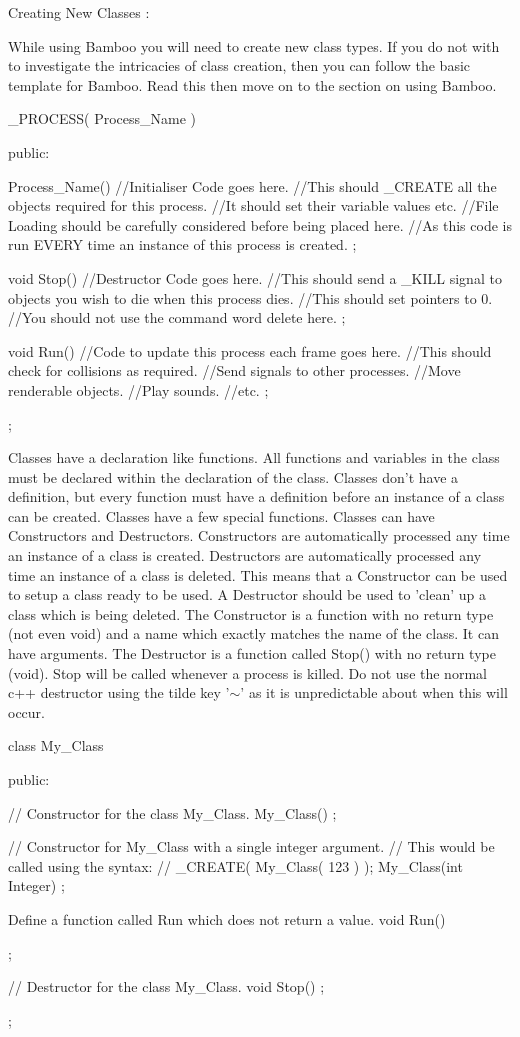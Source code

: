 Creating New Classes : \par
 While using Bamboo you will need to create new class types. If you do not with to investigate the intricacies of class creation, then you can follow the basic template for Bamboo. Read this then move on to the section on using Bamboo. 
\begin{DoxyCode}
 _PROCESS( Process_Name )
 {
 public:

 Process_Name()
 {
  //Initialiser Code goes here.
  //This should _CREATE all the objects required for this process.
  //It should set their variable values etc.
  //File Loading should be carefully considered before being placed here.
  //As this code is run EVERY time an instance of this process is created.
 };

 void Stop()
 {
  //Destructor Code goes here.
  //This should send a _KILL signal to objects you wish to die when this process 
      dies.
  //This should set pointers to 0.
  //You should not use the command word delete here.
 };

 void Run()
 {
  //Code to update this process each frame goes here.
  //This should check for collisions as required.
  //Send signals to other processes.
  //Move renderable objects.
  //Play sounds.
  //etc.
 };

 };
\end{DoxyCode}
 Classes have a declaration like functions. All functions and variables in the class must be declared within the declaration of the class. Classes don't have a definition, but every function must have a definition before an instance of a class can be created. Classes have a few special functions. Classes can have Constructors and Destructors. Constructors are automatically processed any time an instance of a class is created. Destructors are automatically processed any time an instance of a class is deleted. This means that a Constructor can be used to setup a class ready to be used. A Destructor should be used to 'clean' up a class which is being deleted. The Constructor is a function with no return type (not even void) and a name which exactly matches the name of the class. It can have arguments. The Destructor is a function called Stop() with no return type (void). Stop will be called whenever a process is killed. Do not use the normal c++ destructor using the tilde key '$\sim$' as it is unpredictable about when this will occur. 
\begin{DoxyCode}
 class My_Class
 {

 public:

        // Constructor for the class My_Class.
        My_Class()
        {
        };

        // Constructor for My_Class with a single integer argument.
        // This would be called using the syntax:
        // _CREATE( My_Class( 123 ) );
        My_Class(int Integer)
        {
        };


        Define a function called Run which does not return a value.
        void Run()
        {

        };

        // Destructor for the class My_Class.
        void Stop()
        {
        };

 };
\end{DoxyCode}
